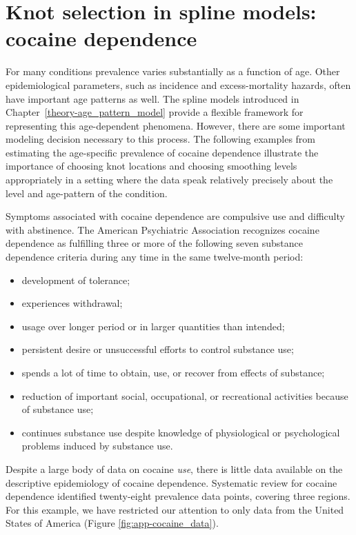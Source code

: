 \chapter{Knot selection in spline models: cocaine dependence}
\label{applications-splines_knot_loc}

For many conditions prevalence varies substantially as a function of
age.  Other epidemiological parameters, such as incidence and
excess-mortality hazards, often have important age patterns as well.
The spline models introduced in Chapter~\ref{theory-age_pattern_model}
provide a flexible framework for representing this age-dependent
phenomena.  However, there are some important modeling decision
necessary to this process.  The following examples from estimating the
age-specific prevalence of cocaine dependence illustrate the
importance of choosing knot locations and choosing smoothing levels
appropriately in a setting where the data speak relatively precisely
about the level and age-pattern of the condition.

Symptoms associated with cocaine dependence are compulsive use and
difficulty with abstinence.  The American Psychiatric Association
recognizes cocaine dependence as fulfilling three or more of the
following seven substance dependence criteria during any time in the 
same twelve-month period: \cite{association_diagnostic_2000, wagner_first_2002}
    \begin{itemize} \label{page:app-substance_dependence}
        \item development of tolerance;
        \item experiences withdrawal;
        \item usage over longer period or in larger quantities than intended;
        \item persistent desire or unsuccessful efforts to control
          substance use;
        \item spends a lot of time to obtain, use, or recover
          from effects of substance;
        \item reduction of important social, occupational, or recreational
          activities because of substance use;
        \item continues substance use despite knowledge of
          physiological or psychological problems induced by substance
          use.
    \end{itemize}

Despite a large body of data on cocaine \emph{use}, there is little
data available on the descriptive epidemiology of cocaine
dependence.\cite{degenhardt_what_2011} Systematic review for cocaine
dependence identified twenty-eight prevalence data points,
covering three regions.  For this example, we have restricted our attention
to only data from the United States of America (Figure \ref{fig:app-cocaine_data}).

